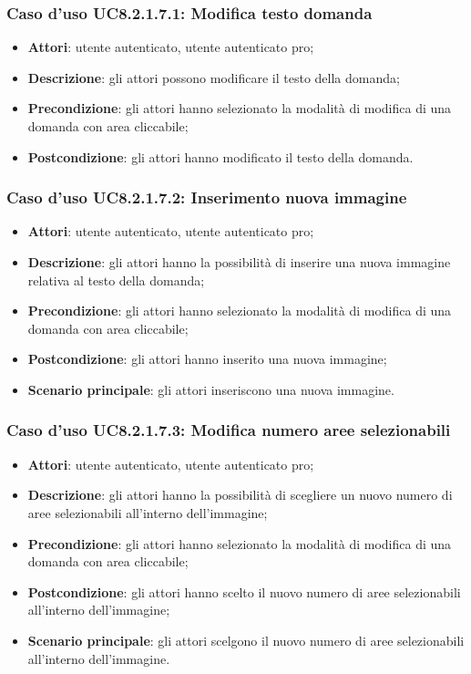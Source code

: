 \subsubsection{Caso d'uso UC8.2.1.7.1: Modifica testo domanda}
\begin{itemize}
	\item \textbf{Attori}: utente autenticato, utente autenticato pro;
	\item \textbf{Descrizione}: gli attori possono modificare il testo della domanda;
	\item \textbf{Precondizione}: gli attori hanno selezionato la modalità di modifica di una domanda con area cliccabile;
	\item \textbf{Postcondizione}: gli attori hanno modificato il testo della domanda.
\end{itemize}

\subsubsection{Caso d'uso UC8.2.1.7.2: Inserimento nuova immagine}
\begin{itemize}
	\item \textbf{Attori}: utente autenticato, utente autenticato pro;
	\item \textbf{Descrizione}: gli attori hanno la possibilità di inserire una nuova immagine relativa al testo della domanda;
	\item \textbf{Precondizione}: gli attori hanno selezionato la modalità di modifica di una domanda con area cliccabile; 
	\item \textbf{Postcondizione}: gli attori hanno inserito una nuova immagine;
	\item \textbf{Scenario principale}: gli attori inseriscono una nuova immagine. 	
\end{itemize}

\subsubsection{Caso d'uso UC8.2.1.7.3: Modifica numero aree selezionabili}
\begin{itemize}
	\item \textbf{Attori}: utente autenticato, utente autenticato pro;
	\item \textbf{Descrizione}: gli attori hanno la possibilità di scegliere un nuovo numero di aree selezionabili all'interno dell'immagine;
	\item \textbf{Precondizione}: gli attori hanno selezionato la modalità di modifica di una domanda con area cliccabile; 
	\item \textbf{Postcondizione}: gli attori hanno scelto il nuovo numero di aree selezionabili all'interno dell'immagine;
	\item \textbf{Scenario principale}: gli attori scelgono il nuovo numero di aree selezionabili all'interno dell'immagine. 	
\end{itemize}

